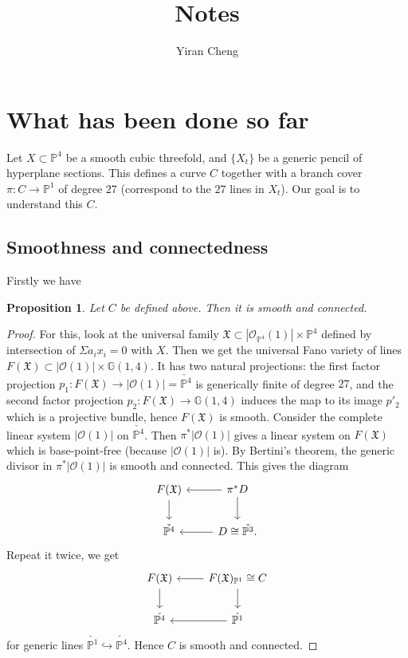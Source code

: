 \documentclass{article}
\title{Notes}
\author{Yiran Cheng}
\newtheorem{proposition}[theorem]{Proposition}
\begin{document}
\maketitle
\section{What has been done so far}
Let $X\subset \mathbb P^4$ be a smooth cubic threefold, and $\{X_t\}$ be a generic pencil of hyperplane sections. This defines a curve $C$ together with a branch cover $\pi \colon C \to \mathbb P^1$ of degree $27$ (correspond to the $27$ lines in $X_t$). Our goal is to understand this $C$.

\subsection{Smoothness and connectedness}
Firstly we have
\begin{proposition}
Let $C$ be defined above. Then it is smooth and connected.
\end{proposition}
\begin{proof}
For this, look at the universal family $\mathfrak X  \subset |\mathcal O_{\mathbb P^4}(1)|\times\mathbb P^4$ defined by intersection of $\Sigma a_i x_i=0$ with $X$. Then we get the universal Fano variety of lines  $F(\mathfrak X)\subset |\mathcal O(1)|\times \mathbb G(1,4)$. It has two natural projections: the first factor projection $p_1 \colon F(\mathfrak X)\to |\mathcal O(1)|=\check {\mathbb P^4}$ is generically finite of degree $27$, and the second factor projection $p_2\colon F(\mathfrak X)\to\mathbb G(1,4)$ induces the map to its image $p'_2$ which is a projective bundle, hence $F(\mathfrak X)$ is smooth. Consider the complete linear system $|\mathcal O(1)|$ on $\check{\mathbb P^4}$. Then $\pi ^* |\mathcal O(1)|$ gives a linear system on $F(\mathfrak X)$ which is base-point-free (because $|\mathcal O(1)|$ is). By Bertini's theorem, the generic divisor in $\pi ^* |\mathcal O(1)|$ is smooth and connected. This gives the diagram
$$
\begin{tikzcd}
F(\mathfrak X)  \arrow [d] & \arrow[l] \pi^*D\arrow[d]\\
\check{\mathbb P^4}   & \arrow[l] D \cong \check{\mathbb P^3}\text{.}
\end{tikzcd}
$$
Repeat it twice, we get
$$
\begin{tikzcd}
F(\mathfrak X)  \arrow [d] & \arrow[l] F(\mathfrak X)_{\mathbb P^1}\cong C  \arrow[d]\\
\check{\mathbb P^4}   & \arrow[l] \check{\mathbb P^1}
\end{tikzcd}
$$
for generic lines $\check{\mathbb P^1} \hookrightarrow \check{\mathbb P^4}$. Hence $C$ is smooth and connected.
\end{proof}
\end{document}
